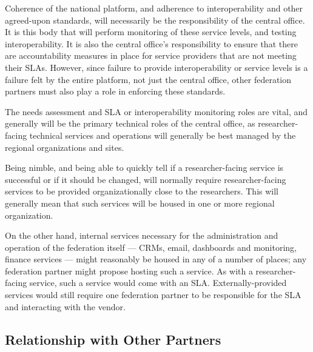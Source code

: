 \documentclass[11pt, letterpaper, twoside]{article}
\begin{document}

Coherence of the national platform, and adherence to interoperability
and other agreed-upon standards, will necessarily be the responsibility
of the central office. It is this body that will perform monitoring of
these service levels, and testing interoperability. It is also the
central office's responsibility to ensure that there are accountability
measures in place for service providers that are not meeting their SLAs.
However, since failure to provide interoperability or service levels is
a failure felt by the entire platform, not just the central office,
other federation partners must also play a role in enforcing these
standards.

The needs assessment and SLA or interoperability monitoring roles are
vital, and generally will be the primary technical roles of the central
office, as researcher-facing technical services and operations will
generally be best managed by the regional organizations and sites.


Being nimble, and being able to quickly tell if a researcher-facing
service is successful or if it should be changed, will normally require
researcher-facing services to be provided organizationally close to the
researchers. This will generally mean that such services will be housed
in one or more regional organization.


On the other hand, internal services necessary for the administration
and operation of the federation itself --- CRMs, email, dashboards and
monitoring, finance services --- might reasonably be housed in any of a
number of places; any federation partner might propose hosting such a
service.  As with a researcher-facing service, such a service would come
with an SLA.  Externally-provided services would still require one
federation partner to be responsible for the SLA and interacting with
the vendor.

\subsection*{Relationship with Other Partners}
%
\end{document}
